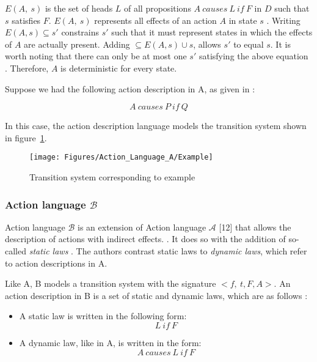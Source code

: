 $ E(A,\ s) $ is the set of heads $ L $ of all propositions $ A\ causes\ L\ if\ F $ in $ D $ such that $ s $ satisfies $ F $.
$ E(A,\ s) $ represents all effects of an action $ A $ in state $ s $ \cite{gelfond_action_1998}.
Writing $ E\left(A,s\right)\subseteq s' $ constrains $ s' $ such that it must represent states in which the effects of $ A $ are actually present.
Adding $ \subseteq E\left(A,s\right)\cup s $, allows $ s' $ to equal $ s $.
It is worth noting that there can only be at most one $ s' $ satisfying the above equation \cite{gelfond_action_1998}.
Therefore, $ A $ is deterministic for every state.

Suppose we had the following action description in A, as given in \cite{gelfond_action_1998}:

$$
A\ causes\ P\ if\ Q
$$

In this case, the action description language models the transition system shown in figure~\ref{fig:action_language_a_example}.

\begin{figure}
    \centering
    \texttt{[image: Figures/Action\_Language\_A/Example]}
    \caption{Transition system corresponding to example}
    \label{fig:action_language_a_example}
\end{figure}

\subsubsection{Action language $ \mathcal{B} $}
\label{subsubsec:action_language_b}

Action language $ \mathcal{B} $ is an extension of Action language $ \mathcal{A} $ [12] that allows the description of actions with indirect effects.
\cite{gelfond_action_1998}.
It does so with the addition of so-called \textit{static laws} \cite{gelfond_action_1998}.
The authors contrast static laws to \textit{dynamic laws}, which refer to action descriptions in A.

Like A, B models a transition system with the signature $<{f,\ t},F,A>$.
An action description in B is a set of static and dynamic laws, which are as follows \cite{gelfond_action_1998}:

\begin{itemize}
    \item A static law is written in the following form:
        $$
        L\ if\ F
        $$

    \item A dynamic law, like in A, is written in the form:
        $$
        A\ causes\ L\ if\ F
        $$
\end{itemize}

